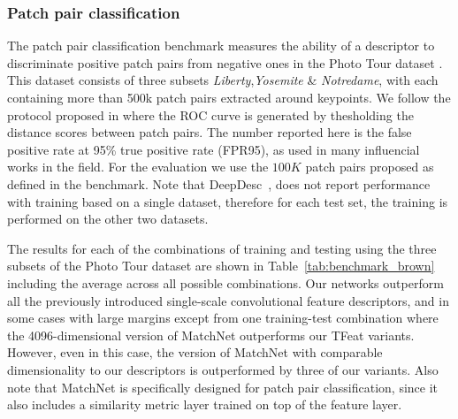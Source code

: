 \subsubsection{Patch pair classification}
\label{sec:patch_classification}
The patch pair classification benchmark measures the ability of
a descriptor to discriminate positive patch pairs from negative ones in
the Photo Tour dataset \cite{BHW10}. This dataset consists of three
subsets {\em Liberty},{\em Yosemite} \& {\em Notredame}, with each
containing more than 500k patch pairs extracted around  keypoints.  We follow the protocol proposed in \cite{BHW10} where
the ROC curve is generated by thesholding the distance scores between
patch pairs. The number reported here is the false positive rate at
95\% true positive rate (FPR95), as used in many influencial works in
the field. For the evaluation we use the $100K$ patch pairs proposed as defined in the benchmark.  Note that 
DeepDesc~\cite{simo2015deepdesc}, does not report performance with training
based on a single dataset, therefore for each test set, the training is
performed on the other two datasets.

The results for each of the combinations of training and testing using
the three subsets of the Photo Tour dataset are shown in
Table~\ref{tab:benchmark_brown} including the average across all possible
combinations. Our networks outperform all
the previously introduced single-scale convolutional feature
descriptors, and in some cases with large margins except from one
training-test combination where the 4096-dimensional version of
MatchNet outperforms our TFeat variants. However, even in this
case, the version of MatchNet with comparable dimensionality to our
descriptors is outperformed by three of our variants. Also note that
MatchNet is specifically designed for patch pair classification,
since it also includes a similarity metric layer  trained on top of the feature layer.


